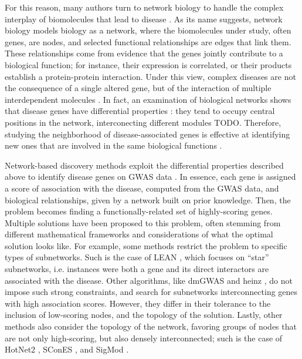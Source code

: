\documentclass[10pt,letterpaper]{article}
\begin{document}
For this reason, many authors turn to network biology to handle the complex interplay of biomolecules that lead to disease \cite{furlong_human_2013}. As its name suggests, network biology models biology as a network, where the biomolecules under study, often genes, are nodes, and selected functional relationships are edges that link them. These relationships come from evidence that the genes jointly contribute to a biological function; for instance, their expression is correlated, or their products establish a protein-protein interaction. Under this view, complex diseases are not the consequence of a single altered gene, but of the interaction of multiple interdependent molecules \cite{barabasi_network_2011}. In fact, an examination of biological networks shows that disease genes have differential properties \cite{barabasi_network_2011,pinero_uncovering_2016}: they tend to occupy central positions in the network, interconecting different modules TODO. Therefore, studying the neighborhood of disease-associated genes is effective at identifying new ones that are involved in the same biological functions \cite{huang_systematic_2018}. 

Network-based discovery methods exploit the differential properties described above to identify disease genes on GWAS data \cite{azencott_network-guided_2016}. In essence, each gene is assigned a score of association with the disease, computed from the GWAS data, and biological relationships, given by a network built on prior knowledge. Then, the problem becomes finding a functionally-related set of highly-scoring genes. Multiple solutions have been proposed to this problem, often stemming from different mathematical frameworks and considerations of what the optimal solution looks like. For example, some methods restrict the problem to specific types of subnetworks. Such is the case of LEAN \cite{gwinner_network-based_2016}, which focuses on ``star'' subnetworks, i.e. instances were both a gene and its direct interactors are associated with the disease. Other algorithms, like dmGWAS \cite{jia_dmgwas:_2011} and heinz \cite{dittrich_identifying_2008}, do not impose such strong constraints, and search for subnetworks interconnecting genes with high association scores. However, they differ in their tolerance to the inclusion of low-scoring nodes, and the topology of the solution. Lastly, other methods also consider the topology of the network, favoring groups of nodes that are not only high-scoring, but also densely interconnected; such is the case of HotNet2 \cite{leiserson_pan-cancer_2015}, SConES \cite{azencott_efficient_2013}, and SigMod \cite{liu_sigmod:_2017}.
\end{document}

